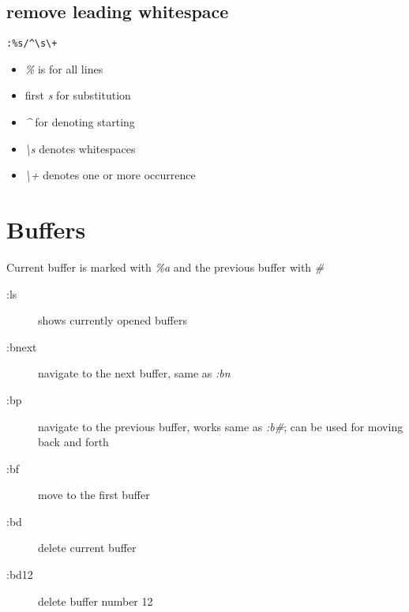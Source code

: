 \documentclass[a4paper, 12pt]{article}
\begin{document}
\subsection{remove leading whitespace}
\begin{verbatim}
:%s/^\s\+
\end{verbatim}
\begin{itemize}
	\item \emph{\%} is for all lines
	\item first \emph{s} for substitution
	\item \emph{\^} for denoting starting
	\item \emph{\textbackslash s} denotes whitespaces
	\item \emph{\textbackslash +} denotes one or more occurrence
\end{itemize}

\section{Buffers}
Current buffer is marked with \emph{\%a} and the previous buffer with \emph{\#} 
\begin{description}
	\item[:ls] shows currently opened buffers	
	\item[:bnext] navigate to the next buffer, same as \emph{:bn}
	\item[:bp] navigate to the previous buffer, works same as \emph{:b\#}; can be used for moving back and forth
	\item[:bf] move to the first buffer
	\item[:bd] delete current buffer
	\item[:bd12] delete buffer number 12
\end{description}

\end{document}

